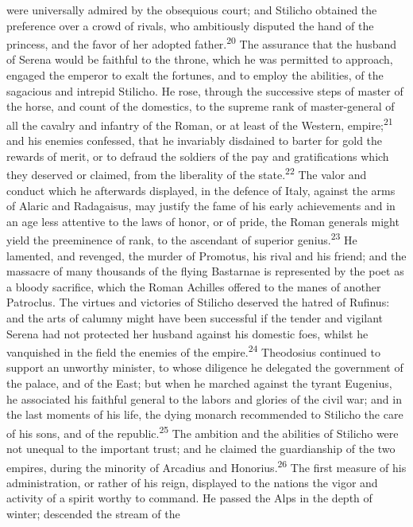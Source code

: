 were universally admired by the obsequious court; and Stilicho
obtained the preference over a crowd of rivals, who ambitiously
disputed the hand of the princess, and the favor of her adopted
father.\textsuperscript{20} The assurance that the husband of Serena would be
faithful to the throne, which he was permitted to approach,
engaged the emperor to exalt the fortunes, and to employ the
abilities, of the sagacious and intrepid Stilicho. He rose,
through the successive steps of master of the horse, and count of
the domestics, to the supreme rank of master-general of all the
cavalry and infantry of the Roman, or at least of the Western,
empire;\textsuperscript{21} and his enemies confessed, that he invariably
disdained to barter for gold the rewards of merit, or to defraud
the soldiers of the pay and gratifications which they deserved or
claimed, from the liberality of the state.\textsuperscript{22} The valor and
conduct which he afterwards displayed, in the defence of Italy,
against the arms of Alaric and Radagaisus, may justify the fame
of his early achievements and in an age less attentive to the
laws of honor, or of pride, the Roman generals might yield the
preeminence of rank, to the ascendant of superior genius.\textsuperscript{23} He
lamented, and revenged, the murder of Promotus, his rival and his
friend; and the massacre of many thousands of the flying
Bastarnae is represented by the poet as a bloody sacrifice, which
the Roman Achilles offered to the manes of another Patroclus. The
virtues and victories of Stilicho deserved the hatred of Rufinus:
and the arts of calumny might have been successful if the tender
and vigilant Serena had not protected her husband against his
domestic foes, whilst he vanquished in the field the enemies of
the empire.\textsuperscript{24} Theodosius continued to support an unworthy
minister, to whose diligence he delegated the government of the
palace, and of the East; but when he marched against the tyrant
Eugenius, he associated his faithful general to the labors and
glories of the civil war; and in the last moments of his life,
the dying monarch recommended to Stilicho the care of his sons,
and of the republic.\textsuperscript{25} The ambition and the abilities of
Stilicho were not unequal to the important trust; and he claimed
the guardianship of the two empires, during the minority of
Arcadius and Honorius.\textsuperscript{26} The first measure of his
administration, or rather of his reign, displayed to the nations
the vigor and activity of a spirit worthy to command. He passed
the Alps in the depth of winter; descended the stream of the
